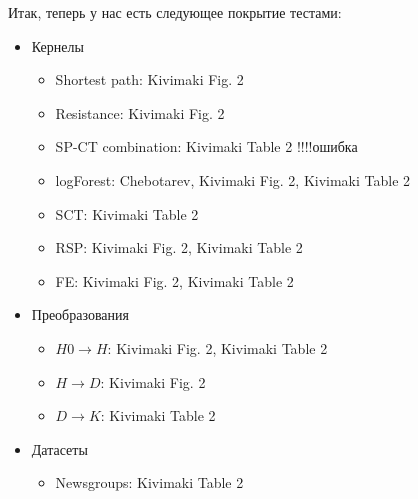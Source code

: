 \documentclass{article}
\begin{document}
Итак, теперь у нас есть следующее покрытие тестами:
\begin{itemize}
  \item Кернелы
  \begin{itemize}
    \item Shortest path: Kivimaki Fig. 2
    \item Resistance: Kivimaki Fig. 2
    \item SP-CT combination: Kivimaki Table 2 !!!!ошибка
    \item logForest: Chebotarev, Kivimaki Fig. 2, Kivimaki Table 2
    \item SCT: Kivimaki Table 2
    \item RSP: Kivimaki Fig. 2, Kivimaki Table 2
    \item FE: Kivimaki Fig. 2, Kivimaki Table 2
  \end{itemize}
  \item Преобразования
  \begin{itemize}
    \item $H0 \rightarrow H$: Kivimaki Fig. 2, Kivimaki Table 2 
    \item $H \rightarrow D$: Kivimaki Fig. 2
    \item $D \rightarrow K$: Kivimaki Table 2
   \end{itemize}
   \item Датасеты
   \begin{itemize}
     \item Newsgroups: Kivimaki Table 2
   \end{itemize}
\end{itemize}
\end{document}
